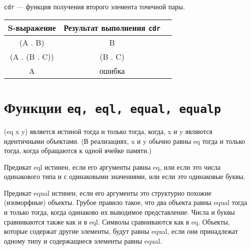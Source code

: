 \texttt{cdr} --- функция получения второго элемента точечной пары.

\begin{table}[!ht]
	\small
	\begin{center}
		\begin{tabular}{|c|c|c|}
			\hline
			\bfseries S-выражение & \bfseries Результат выполнения \texttt{cdr} \\\hline
			(A . B) & B \\ \hline
			(A . (B . C)) & (B . C) \\\hline
			A & ошибка \\\hline
		\end{tabular}
	\end{center}
\end{table}

\section{Функции \texttt{eq, eql, equal, equalp}}
(eq x y) является истиной тогда и только тогда, когда, x и y являются идентичными объектами. (В реализациях, x и y обычно равны eq тогда и только тогда, когда обращаются к одной ячейке памяти.)

Предикат eql истинен, если его аргументы равны eq, или если это числа одинакового типа и с одинаковыми значениями, или если это одинаковые буквы.

Предикат equal истинен, если его аргументы это структурно похожие (изоморфные) объекты. Грубое правило такое, что два объекта равны equal тогда и только тогда, когда одинаково их выводимое представление. Числа и буквы сравниваются также как и в eql. Символы сравниваются как в eq. Объекты, которые содержат другие элементы, будут равны equal, если они принадлежат одному типу и содержащиеся элементы равны equal.  

